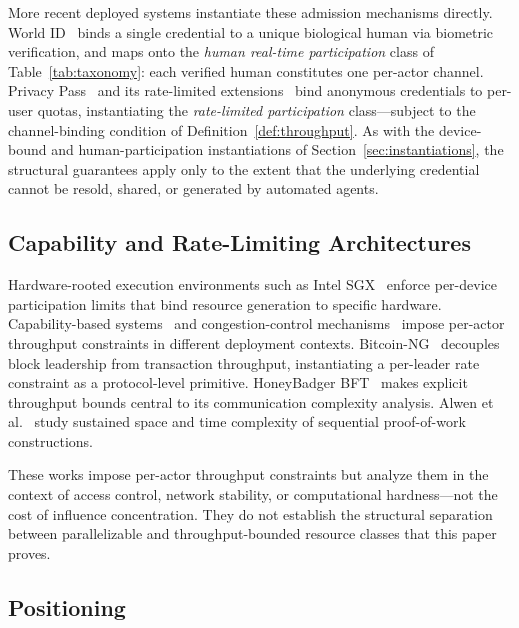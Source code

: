 \documentclass[manuscript,review]{acmart}
\theoremstyle{remark}
\begin{document}
	More recent deployed systems instantiate these admission
	mechanisms directly.
	World ID~\cite{worldcoin2023whitepaper} binds a single
	credential to a unique biological human via biometric
	verification, and maps onto the \emph{human real-time
		participation} class of Table~\ref{tab:taxonomy}: each
	verified human constitutes one per-actor channel.
	Privacy Pass~\cite{davidson2018privacypass} and its
	rate-limited extensions~\cite{chu2023ratelimited} bind
	anonymous credentials to per-user quotas, instantiating
	the \emph{rate-limited participation} class---subject to
	the channel-binding condition of
	Definition~\ref{def:throughput}.
	As with the device-bound and human-participation
	instantiations of Section~\ref{sec:instantiations}, the
	structural guarantees apply only to the extent that the
	underlying credential cannot be resold, shared, or
	generated by automated agents.
	
	\subsection{Capability and Rate-Limiting Architectures}
	\label{ssec:rw_capability}
	
	Hardware-rooted execution environments such as
	Intel SGX~\cite{costan2016intel} enforce per-device
	participation limits that bind resource generation
	to specific hardware.
	Capability-based systems~\cite{levy1984capability}
	and congestion-control mechanisms~\cite{jacobson1988congestion}
	impose per-actor throughput constraints in different
	deployment contexts.
	Bitcoin-NG~\cite{eyal2018bitcoinng} decouples block
	leadership from transaction throughput, instantiating
	a per-leader rate constraint as a protocol-level primitive.
	HoneyBadger BFT~\cite{miller2016honeybadger} makes
	explicit throughput bounds central to its communication
	complexity analysis.
	Alwen et al.~\cite{alwen2019blockchain} study
	sustained space and time complexity of sequential
	proof-of-work constructions.
	
	These works impose per-actor throughput constraints
	but analyze them in the context of access control,
	network stability, or computational hardness---not
	the cost of influence concentration.
	They do not establish the structural separation between
	parallelizable and throughput-bounded resource classes
	that this paper proves.
	
	\subsection{Positioning}
	\label{ssec:rw_positioning}
	
\end{document}
